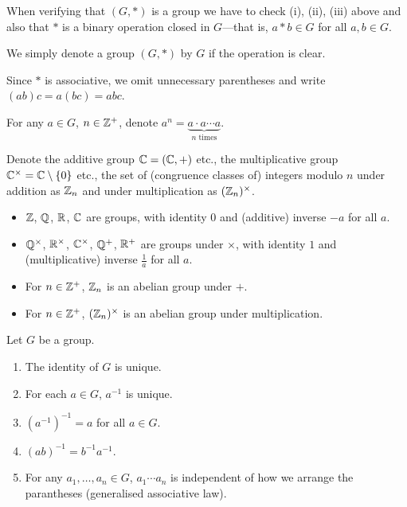 \begin{remark}
When verifying that $(G,\ast)$ is a group we have to check (i), (ii), (iii) above and also that $\ast$ is a binary operation closed in $G$---that is, $a\ast b\in G$ for all $a,b\in G$.
\end{remark}

\begin{notation}
We simply denote a group $(G,\ast)$ by $G$ if the operation is clear.
\end{notation}

\begin{notation}
Since $\ast$ is associative, we omit unnecessary parentheses and write $(ab)c=a(bc)=abc$.
\end{notation}

\begin{notation}
For any $a\in G$, $n\in\mathbb Z^+$, denote $a^n=\underbrace{a\cdot a\cdots a}_\text{$n$ times}$.
\end{notation}

\begin{notation}
Denote the additive group $\mathbb C=(\mathbb C,+)$ etc., the multiplicative group $\mathbb C^\times=\mathbb C\setminus\{0\}$ etc., the set of (congruence classes of) integers modulo $n$ under addition as $\mathbb Z_n$ and under multiplication as $(\mathbb Z_n)^\times$.
\end{notation}

\begin{example}
\begin{itemize}
\item $\mathbb Z$, $\mathbb Q$, $\mathbb R$, $\mathbb C$ are groups, with identity $0$ and (additive) inverse $-a$ for all $a$.
\item $\mathbb Q^\times$, $\mathbb R^\times$, $\mathbb C^\times$, $\mathbb Q^+$, $\mathbb R^+$ are groups under $\times$, with identity $1$ and (multiplicative) inverse $\frac{1}{a}$ for all $a$.
\item For $n\in\mathbb Z^+$, $\mathbb Z_n$ is an abelian group under $+$.
\item For $n\in\mathbb Z^+$, $(\mathbb Z_n)^\times$ is an abelian group under multiplication.
\end{itemize}
\end{example}

\begin{proposition}
Let $G$ be a group.
\begin{enumerate}[label=(\roman*)]
\item The identity of $G$ is unique.
\item For each $a\in G$, $a^{-1}$ is unique.
\item $(a^{-1})^{-1}=a$ for all $a\in G$.
\item $(ab)^{-1}=b^{-1}a^{-1}$.
\item For any $a_1,\dots,a_n\in G$, $a_1\cdots a_n$ is independent of how we arrange the parantheses (generalised associative law).
\end{enumerate}
\end{proposition}

